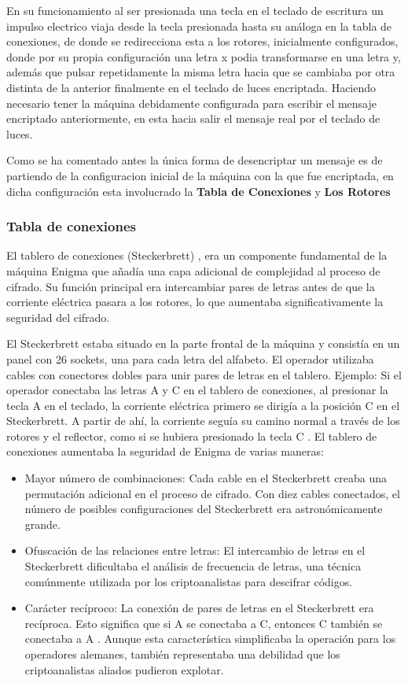 \documentclass{article}
\begin{document}
En su funcionamiento al ser presionada una tecla en el teclado de escritura un
impulso electrico viaja desde la 
tecla presionada hasta su análoga en la tabla de conexiones, de donde se redirecciona
esta a los rotores, inicialmente configurados, donde por su propia configuración
una letra x podia transformarse en una letra y, además que pulsar repetidamente la misma letra
hacia que se cambiaba por otra distinta de la anterior finalmente en el teclado de luces encriptada.
Haciendo necesario tener la máquina debidamente configurada para escribir el mensaje encriptado anteriormente,
en esta hacia salir el mensaje real por el teclado de luces.

Como se ha comentado antes la única forma de desencriptar un mensaje es de partiendo de la configuracion
inicial de la máquina con la que fue encriptada, en dicha configuración esta involucrado la \textbf{ Tabla de Conexiones}
y \textbf{Los Rotores}


\subsubsection{Tabla de conexiones}
El tablero de conexiones (Steckerbrett) \cite{AlanTuringEnigmaO} \cite{EnigmaC200s} ,
era un componente fundamental de la máquina Enigma que añadía una capa adicional
de complejidad al proceso de cifrado. Su función principal era intercambiar pares
de letras antes de que la corriente eléctrica pasara a los rotores, lo que aumentaba
significativamente la seguridad del cifrado.

El Steckerbrett estaba situado en la parte frontal de la máquina y consistía
en un panel con 26 sockets, una para cada letra del alfabeto. 
El operador utilizaba cables con conectores dobles para unir pares de letras en el tablero.
Ejemplo: Si el operador conectaba las letras  A  y  C  en el tablero de conexiones,
 al presionar la tecla  A  en el teclado, la corriente eléctrica primero se dirigía
  a la posición  C  en el Steckerbrett. A partir de ahí, la corriente seguía su camino
   normal a través de los rotores y el reflector, como si se hubiera presionado la tecla  C .
El tablero de conexiones aumentaba la seguridad de Enigma de varias maneras:
\begin{itemize}
    \item Mayor número de combinaciones: Cada cable en el Steckerbrett
    creaba una permutación adicional en el proceso de cifrado.
    Con diez cables conectados, el número de posibles configuraciones del
    Steckerbrett era astronómicamente grande.
    \item Ofuscación de las relaciones entre letras: 
    El intercambio de letras en el Steckerbrett dificultaba 
    el análisis de frecuencia de letras, una técnica comúnmente 
    utilizada por los criptoanalistas para descifrar códigos.
    \item Carácter recíproco: La conexión de pares de letras en el Steckerbrett
    era recíproca. Esto significa que si A se conectaba a C, entonces C también se conectaba a  A . 
    Aunque esta característica simplificaba la operación para los operadores alemanes, también representaba 
    una debilidad que los criptoanalistas aliados pudieron explotar.
\end{itemize}
\end{document}
